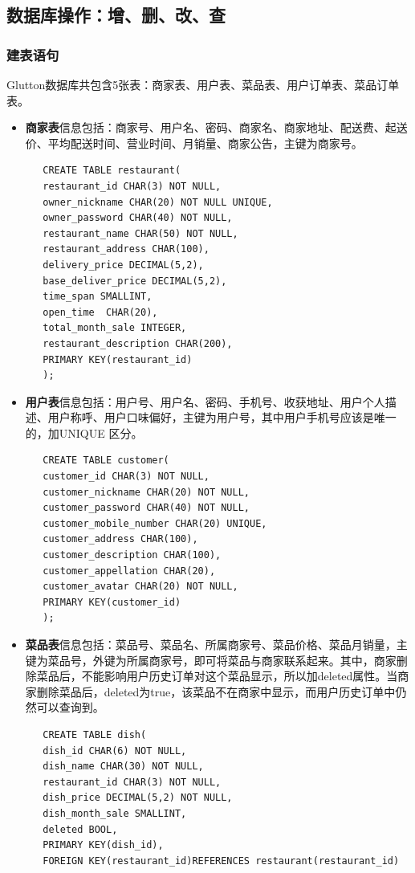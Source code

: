 \documentclass[12pt, oneside,a4paper]{article}
\begin{document}
\subsection{数据库操作：增、删、改、查}
\subsubsection{建表语句}
Glutton数据库共包含5张表：商家表、用户表、菜品表、用户订单表、菜品订单表。
 \begin{itemize}
 \item \textbf{商家表}信息包括：商家号、用户名、密码、商家名、商家地址、配送费、起送价、平均配送时间、营业时间、月销量、商家公告，主键为商家号。
 \begin{lstlisting}
   CREATE TABLE restaurant(
   restaurant_id CHAR(3) NOT NULL,
   owner_nickname CHAR(20) NOT NULL UNIQUE,
   owner_password CHAR(40) NOT NULL,
   restaurant_name CHAR(50) NOT NULL,
   restaurant_address CHAR(100),
   delivery_price DECIMAL(5,2),
   base_deliver_price DECIMAL(5,2),
   time_span SMALLINT,
   open_time  CHAR(20),
   total_month_sale INTEGER,
   restaurant_description CHAR(200),
   PRIMARY KEY(restaurant_id)
   );
\end{lstlisting}
 \item \textbf{用户表}信息包括：用户号、用户名、密码、手机号、收获地址、用户个人描述、用户称呼、用户口味偏好，主键为用户号，其中用户手机号应该是唯一的，加UNIQUE 区分。
      \begin{lstlisting}
   CREATE TABLE customer(
   customer_id CHAR(3) NOT NULL,
   customer_nickname CHAR(20) NOT NULL,
   customer_password CHAR(40) NOT NULL,
   customer_mobile_number CHAR(20) UNIQUE,
   customer_address CHAR(100),
   customer_description CHAR(100),
   customer_appellation CHAR(20),
   customer_avatar CHAR(20) NOT NULL,
   PRIMARY KEY(customer_id)
   );
      \end{lstlisting}
 \item \textbf{菜品表}信息包括：菜品号、菜品名、所属商家号、菜品价格、菜品月销量，主键为菜品号，外键为所属商家号，即可将菜品与商家联系起来。其中，商家删除菜品后，不能影响用户历史订单对这个菜品显示，所以加deleted属性。当商家删除菜品后，deleted为true，该菜品不在商家中显示，而用户历史订单中仍然可以查询到。
     \begin{lstlisting}
   CREATE TABLE dish(
   dish_id CHAR(6) NOT NULL,
   dish_name CHAR(30) NOT NULL,
   restaurant_id CHAR(3) NOT NULL,
   dish_price DECIMAL(5,2) NOT NULL,
   dish_month_sale SMALLINT,
   deleted BOOL,
   PRIMARY KEY(dish_id),
   FOREIGN KEY(restaurant_id)REFERENCES restaurant(restaurant_id)

\end{lstlisting}
\end{itemize}
\end{document}
